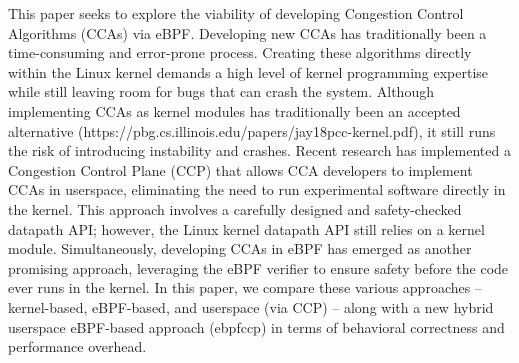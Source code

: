 \documentclass[../main.tex]{subfiles}
\begin{document}
This paper seeks to explore the viability of developing Congestion Control Algorithms (CCAs) via eBPF. Developing new CCAs has traditionally been a time-consuming and error-prone process. Creating these algorithms directly within the Linux kernel demands a high level of kernel programming expertise while still leaving room for bugs that can crash the system. Although implementing CCAs as kernel modules has traditionally been an accepted alternative (https://pbg.cs.illinois.edu/papers/jay18pcc-kernel.pdf), it still runs the risk of introducing instability and crashes. Recent research has implemented a Congestion Control Plane (CCP) \cite{ccp} that allows CCA developers to implement CCAs in userspace, eliminating the need to run experimental software directly in the kernel. This approach involves a carefully designed and safety-checked datapath API; however, the Linux kernel datapath API still relies on a kernel module. Simultaneously, developing CCAs in eBPF \cite{ebpf_cca} has emerged as another promising approach, leveraging the eBPF verifier to ensure safety before the code ever runs in the kernel. In this paper, we compare these various approaches -- kernel-based, eBPF-based, and userspace (via CCP) -- along with a new hybrid userspace eBPF-based approach (ebpfccp) in terms of behavioral correctness and performance overhead.
\end{document}
